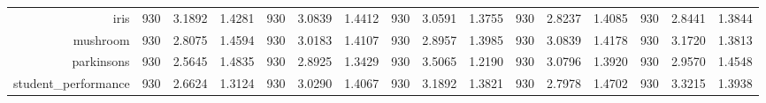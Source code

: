 \begin{table}[htbp]
{\begin{tabular}{rccccccccccccccc}
			iris                                & 930                                 & 3.1892                                                                    & 1.4281          & 930                                & 3.0839                                                                             & 1.4412          & 930                                & 3.0591                                                                    & 1.3755          & 930                                & \cellcolor[rgb]{ .776,  .937,  .808}\textcolor[rgb]{ 0,  .38,  0}{2.8237} & 1.4085          & 930                                    & 2.8441                                                                    & 1.3844          \\
			mushroom                            & 930                                 & \cellcolor[rgb]{ .776,  .937,  .808}\textcolor[rgb]{ 0,  .38,  0}{2.8075} & 1.4594          & 930                                & 3.0183                                                                             & 1.4107          & 930                                & 2.8957                                                                    & 1.3985          & 930                                & 3.0839                                                                    & 1.4178          & 930                                    & 3.1720                                                                    & 1.3813          \\
			parkinsons                          & 930                                 & \cellcolor[rgb]{ .776,  .937,  .808}\textcolor[rgb]{ 0,  .38,  0}{2.5645} & 1.4835          & 930                                & 2.8925                                                                             & 1.3429          & 930                                & 3.5065                                                                    & 1.2190          & 930                                & 3.0796                                                                    & 1.3920          & 930                                    & 2.9570                                                                    & 1.4548          \\
			student\_performance                & 930                                 & \cellcolor[rgb]{ .776,  .937,  .808}\textcolor[rgb]{ 0,  .38,  0}{2.6624} & 1.3124          & 930                                & 3.0290                                                                             & 1.4067          & 930                                & 3.1892                                                                    & 1.3821          & 930                                & 2.7978                                                                    & 1.4702          & 930                                    & 3.3215                                                                    & 1.3938          \\

\end{tabular}}
\end{table}
